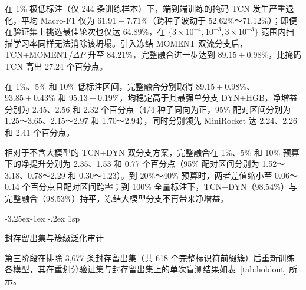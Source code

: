 \documentclass[12pt]{iopjournal}
\makeatletter
\renewcommand\subsection{\@startsection{subsection}{2}{\z@}%
                   {-3.25ex\@plus -1ex \@minus -.2ex}%
                   {1sp}%
                   {\reset@font\normalsize\bfseries\raggedright}}
\makeatother
\begin{document}
在 1\% 极低标注（仅 244 条训练样本）下，端到端训练的掩码 TCN 发生严重退化，平均 Macro-F1 仅为 $61.91\pm7.71\%$（跨种子波动于 52.62\%～71.12\%）；即便在验证集上挑选最佳轮次也仅达 64.89\%，在 $\{3\times 10^{-4},10^{-3},3\times 10^{-3}\}$ 范围内扫描学习率同样无法消除该坍塌。引入冻结 MOMENT 双流分支后，TCN+MOMENT/$\Delta P$ 升至 84.21\%，完整融合进一步达到 $89.15\pm0.98\%$，比掩码 TCN 高出 27.24 个百分点。

在 1\%、5\% 和 10\% 低标注区间，完整融合分别取得 $89.15\pm0.98\%$、$93.85\pm0.43\%$ 和 $95.13\pm0.19\%$，均稳定高于其最强单分支 DYN+HGB，净增益分别为 2.45、2.56 和 2.32 个百分点（4/4 种子同向为正，95\% 配对区间分别为 1.25～3.65、2.15～2.97 和 1.70～2.94），同时分别领先 MiniRocket 达 2.24、2.26 和 2.41 个百分点。

相对于不含大模型的 TCN+DYN 双分支方案，完整融合在 1\%、5\% 和 10\% 预算下的净提升分别为 2.35、1.53 和 0.77 个百分点（95\% 配对区间分别为 1.52～3.18、0.78～2.29 和 0.30～1.23）。到 20\%～40\% 预算时，两者差值缩小至 0.06～0.14 个百分点且配对区间跨零；到 100\% 全量标注下，TCN+DYN（98.54\%）与完整融合（98.53\%）持平，冻结大模型分支不再带来净增益。

\subsection{封存留出集与簇级泛化审计}\label{sec:holdout}

第三阶段在排除 3,677 条封存留出集（共 618 个完整标识符前缀簇）后重新训练各模型，其在重划分验证集与封存留出集上的单次盲测结果如表~\ref{tab:holdout} 所示。
\end{document}
